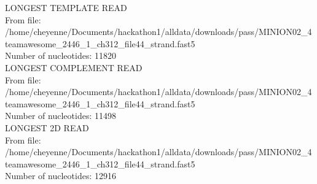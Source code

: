 
LONGEST TEMPLATE READ\\
From file: /home/cheyenne/Documents/hackathon1/alldata/downloads/pass/MINION02\_4teamawesome\_2446\_1\_ch312\_file44\_strand.fast5\\
Number of nucleotides: 11820\\

LONGEST COMPLEMENT READ\\
From file: /home/cheyenne/Documents/hackathon1/alldata/downloads/pass/MINION02\_4teamawesome\_2446\_1\_ch312\_file44\_strand.fast5\\
Number of nucleotides: 11498\\

LONGEST 2D READ\\
From file: /home/cheyenne/Documents/hackathon1/alldata/downloads/pass/MINION02\_4teamawesome\_2446\_1\_ch312\_file44\_strand.fast5\\
Number of nucleotides: 12916\\
